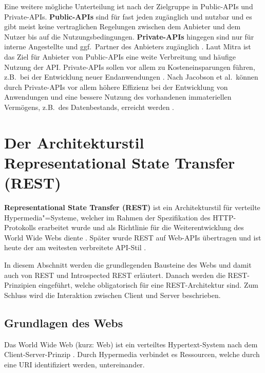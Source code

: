 Eine weitere mögliche Unterteilung ist nach der Zielgruppe in Public-APIs und Private-APIs. \textbf{Public-APIs} sind für fast jeden zugänglich und nutzbar und es gibt meist keine vertraglichen Regelungen zwischen dem Anbieter und dem Nutzer bis auf die Nutzungsbedingungen. \textbf{Private-APIs} hingegen sind nur für interne Angestellte und ggf.\ Partner des Anbieters zugänglich \autocite[S.~7]{Jacobson2011}. Laut Mitra ist das Ziel für Anbieter von Public-APIs eine weite Verbreitung und häufige Nutzung der API. Private-APIs sollen vor allem zu Kosteneinsparungen führen, z.B.\ bei der Entwicklung neuer Endanwendungen \autocite[06:47--07:03]{Mitra2013}. Nach Jacobson et al.\ können durch Private-APIs vor allem höhere Effizienz bei der Entwicklung von Anwendungen und eine bessere Nutzung des vorhandenen immateriellen Vermögens, z.B.\ des Datenbestands, erreicht werden \autocite[S.~27]{Jacobson2011}.

\section{Der Architekturstil Representational State Transfer (REST)}\label{sec:theory|rest}

\textbf{Representational State Transfer (REST)} ist ein Architekturstil für verteilte Hypermedia"=Systeme, welcher im Rahmen der Spezifikation des HTTP-Protokolls erarbeitet wurde und als Richtlinie für die Weiterentwicklung des World Wide Webs diente \autocite{Fielding2017}. Später wurde REST auf Web-APIs übertragen und ist heute der am weitesten verbreitete API-Stil \autocite[S.~10]{Jin2018}.

In diesem Abschnitt werden die grundlegenden Bausteine des Webs \textendash{} und damit auch von REST \autocite[S.~12]{Webber2010} und Introspected REST \textendash{} erläutert. Danach werden die REST-Prinzipien eingeführt, welche obligatorisch für eine REST-Architektur sind. Zum Schluss wird die Interaktion zwischen Client und Server beschrieben.

\subsection{Grundlagen des Webs}
Das World Wide Web (kurz: Web) ist ein verteiltes Hypertext-System nach dem Client-Server-Prinzip \autocite{BernersLee1989}. Durch Hypermedia verbindet es Ressourcen, welche durch eine URI identifiziert werden, untereinander.

